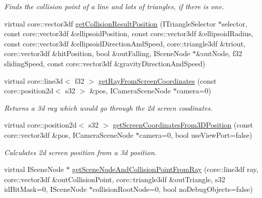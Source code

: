 \begin{DoxyCompactItemize}
\begin{DoxyCompactList}\small\item\em Finds the collision point of a line and lots of triangles, if there is one. \end{DoxyCompactList}\item 
virtual core\-::vector3df \hyperlink{classirr_1_1scene_1_1_c_scene_collision_manager_a76c8edc535c7226f31de8bedec98fc65}{get\-Collision\-Result\-Position} (I\-Triangle\-Selector $\ast$selector, const core\-::vector3df \&ellipsoid\-Position, const core\-::vector3df \&ellipsoid\-Radius, const core\-::vector3df \&ellipsoid\-Direction\-And\-Speed, core\-::triangle3df \&triout, core\-::vector3df \&hit\-Position, bool \&out\-Falling, I\-Scene\-Node $\ast$\&out\-Node, f32 sliding\-Speed, const core\-::vector3df \&gravity\-Direction\-And\-Speed)
\item 
\hypertarget{classirr_1_1scene_1_1_c_scene_collision_manager_af285a613c49299d3e5a113bd2f47e6a4}{virtual core\-::line3d$<$ f32 $>$ \hyperlink{classirr_1_1scene_1_1_c_scene_collision_manager_af285a613c49299d3e5a113bd2f47e6a4}{get\-Ray\-From\-Screen\-Coordinates} (const core\-::position2d$<$ s32 $>$ \&pos, I\-Camera\-Scene\-Node $\ast$camera=0)}\label{classirr_1_1scene_1_1_c_scene_collision_manager_af285a613c49299d3e5a113bd2f47e6a4}

\begin{DoxyCompactList}\small\item\em Returns a 3d ray which would go through the 2d screen coodinates. \end{DoxyCompactList}\item 
\hypertarget{classirr_1_1scene_1_1_c_scene_collision_manager_a12d8bce50b830b4b9a07f1d942a06dd7}{virtual core\-::position2d$<$ s32 $>$ \hyperlink{classirr_1_1scene_1_1_c_scene_collision_manager_a12d8bce50b830b4b9a07f1d942a06dd7}{get\-Screen\-Coordinates\-From3\-D\-Position} (const core\-::vector3df \&pos, I\-Camera\-Scene\-Node $\ast$camera=0, bool use\-View\-Port=false)}\label{classirr_1_1scene_1_1_c_scene_collision_manager_a12d8bce50b830b4b9a07f1d942a06dd7}

\begin{DoxyCompactList}\small\item\em Calculates 2d screen position from a 3d position. \end{DoxyCompactList}\item 
virtual I\-Scene\-Node $\ast$ \hyperlink{classirr_1_1scene_1_1_c_scene_collision_manager_ab3837e8e7092b4c5b1b0aa43f6787f6b}{get\-Scene\-Node\-And\-Collision\-Point\-From\-Ray} (core\-::line3df ray, core\-::vector3df \&out\-Collision\-Point, core\-::triangle3df \&out\-Triangle, s32 id\-Bit\-Mask=0, I\-Scene\-Node $\ast$collision\-Root\-Node=0, bool no\-Debug\-Objects=false)
\end{DoxyCompactItemize}


